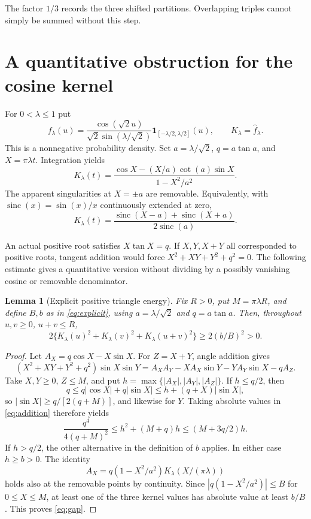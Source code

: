 \documentclass[11pt]{article}
\newtheorem{lemma}[theorem]{Lemma}
\theoremstyle{remark}
\begin{document}
The factor $1/3$ records the three shifted partitions. Overlapping triples
cannot simply be summed without this step.

\section{A quantitative obstruction for the cosine kernel}

For $0<\lambda\le1$ put
\begin{equation}\label{eq:density}
 f_\lambda(u)=\frac{\cos(\sqrt2u)}{\sqrt2\sin(\lambda/\sqrt2)}
       \mathbf1_{[-\lambda/2,\lambda/2]}(u),\qquad
 K_\lambda=\widehat f_\lambda.
\end{equation}
This is a nonnegative probability density. Set $a=\lambda/\sqrt2$,
$q=a\tan a$, and $X=\pi\lambda t$. Integration yields
\begin{equation}\label{eq:kernel}
 K_\lambda(t)=
 \frac{\cos X-(X/a)\cot(a)\sin X}{1-X^2/a^2}.
\end{equation}
The apparent singularities at $X=\pm a$ are removable. Equivalently,
with $\operatorname{sinc}(x)=\sin(x)/x$ continuously extended at zero,
\begin{equation}\label{eq:sinc}
 K_\lambda(t)=
 \frac{\operatorname{sinc}(X-a)+\operatorname{sinc}(X+a)}
      {2\operatorname{sinc}(a)}.
\end{equation}

An actual positive root satisfies $X\tan X=q$. If $X,Y,X+Y$ all
corresponded to positive roots, tangent addition would force
$X^2+XY+Y^2+q^2=0$. The following estimate gives a quantitative version
without dividing by a possibly vanishing cosine or removable denominator.

\begin{lemma}[Explicit positive triangle energy]\label{lem:gap}
Fix $R>0$, put $M=\pi\lambda R$, and define $B,b$ as in
\eqref{eq:explicit}, using $a=\lambda/\sqrt2$ and $q=a\tan a$.
Then, throughout $u,v\ge0$, $u+v\le R$,
\begin{equation}\label{eq:gap}
 2\{K_\lambda(u)^2+K_\lambda(v)^2+K_\lambda(u+v)^2\}
 \ge2(b/B)^2>0.
\end{equation}
\end{lemma}
\begin{proof}
Let $A_X=q\cos X-X\sin X$. For $Z=X+Y$, angle addition gives
\begin{equation}\label{eq:addition}
 (X^2+XY+Y^2+q^2)\sin X\sin Y
 =A_XA_Y-XA_X\sin Y-YA_Y\sin X-qA_Z.
\end{equation}
Take $X,Y\ge0$, $Z\le M$, and put
$h=\max\{|A_X|,|A_Y|,|A_Z|\}$. If $h\le q/2$, then
\[
 q\le q|\cos X|+q|\sin X|
 \le h+(q+X)|\sin X|,
\]
so $|\sin X|\ge q/[2(q+M)]$, and likewise for $Y$. Taking absolute
values in \eqref{eq:addition} therefore yields
\[
 \frac{q^4}{4(q+M)^2}\le h^2+(M+q)h
 \le(M+3q/2)h.
\]
If $h>q/2$, the other alternative in the definition of $b$ applies.
In either case $h\ge b>0$. The identity
\[
 A_X=q(1-X^2/a^2)K_\lambda(X/(\pi\lambda))
\]
holds also at the removable points by continuity. Since
$|q(1-X^2/a^2)|\le B$ for $0\le X\le M$, at least one of the three
kernel values has absolute value at least $b/B$. This proves
\eqref{eq:gap}.
\end{proof}
\end{document}
